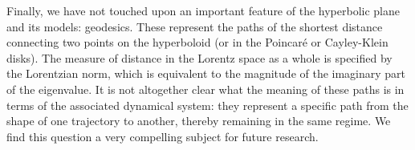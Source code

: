 Finally, we have not touched upon an important feature of the hyperbolic plane and its models: geodesics. These represent the paths of the shortest distance connecting two points on the hyperboloid (or in the Poincaré or Cayley-Klein disks).  The measure of distance in the Lorentz space as a whole is specified by the Lorentzian norm, which is equivalent to the magnitude of the imaginary part of the eigenvalue. It is not altogether clear what the meaning of these paths is in terms of the associated dynamical system: they represent a specific path from the shape of one trajectory to another, thereby remaining in the same regime. We find this question a very compelling subject for future research.

